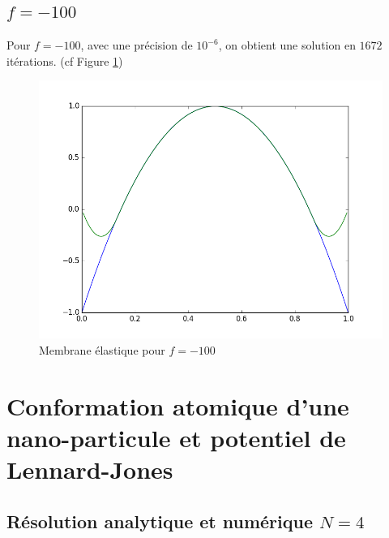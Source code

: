 \documentclass[paper=a4, fontsize=11pt]{article}
\begin{document}
\subsection{$f=-100$}
Pour $f=-100$, avec une précision de $10^{-6}$, on obtient une solution en $1672$ itérations. (cf Figure \ref{étiquette3})
\begin{figure}
 	\begin{center}
   \includegraphics[scale=0.6]{uzawa_-100}
   \end{center}
   \caption{\label{étiquette3} Membrane élastique pour $f=-100$ }
\end{figure}

\section{Conformation atomique d'une nano-particule et potentiel de Lennard-Jones}
\subsection{Résolution analytique et numérique $N=4$}
\end{document}
